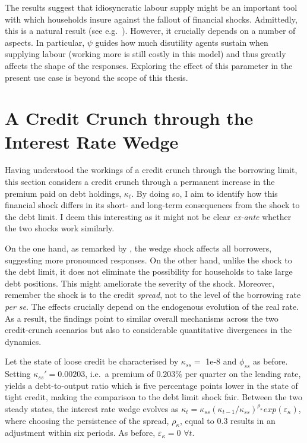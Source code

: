 \documentclass[a4paper,12pt]{article} %
\numberwithin{equation}{section} %
\numberwithin{figure}{section}
\numberwithin{table}{section}
\begin{document}
The results suggest that idiosyncratic labour supply might be an important tool with which households insure against the fallout of financial shocks. Admittedly, this is a natural result (see e.g.~\cite{heath2009}). However, it crucially depends on a number of aspects. In particular, $\psi$ guides how much disutility agents sustain when supplying labour (working more is still costly in this model) and thus greatly affects the shape of the responses. Exploring the effect of this parameter in the present use case is beyond the scope of this thesis.

\section{A Credit Crunch through the Interest Rate Wedge}
\label{sec:wedge}

Having understood the workings of a credit crunch through the borrowing limit, this section considers a credit crunch through a permanent increase in the premium paid on debt holdings, $\kappa_t$. By doing so, I aim to identify how this financial shock differs in its short- and long-term consequences from the shock to the debt limit. I deem this interesting as it might not be clear \textit{ex-ante} whether the two shocks work similarly.

On the one hand, as remarked by \textcite{gl2017}, the wedge shock affects all borrowers, suggesting more pronounced responses. On the other hand, unlike the shock to the debt limit, it does not eliminate the possibility for households to take large debt positions. This might ameliorate the severity of the shock. Moreover, remember the shock is to the credit \textit{spread}, not to the level of the borrowing rate \textit{per se}. The effects crucially depend on the endogenous evolution of the real rate. As a result, the findings point to similar overall mechanisms across the two credit-crunch scenarios but also to considerable quantitative divergences in the dynamics. 

Let the state of loose credit be characterised by $\kappa_{ss} =$ 1e-8 and $\phi_{ss}$ as before. Setting $\kappa_{ss}' = 0.00203$, i.e.~a premium of $0.203\%$ per quarter on the lending rate, yields a debt-to-output ratio which is five percentage points lower in the state of tight credit, making the comparison to the debt limit shock fair. Between the two steady states, the interest rate wedge evolves as $\kappa_t = \kappa_{ss} ( \kappa_{t-1} / \kappa_{ss} )^{\rho_{\kappa}} exp(\varepsilon_{\kappa})$, where choosing the persistence of the spread, $\rho_{\kappa}$, equal to $0.3$ results in an adjustment within six periods. As before, $\varepsilon_{\kappa} = 0$ $\forall t$.
\end{document}
